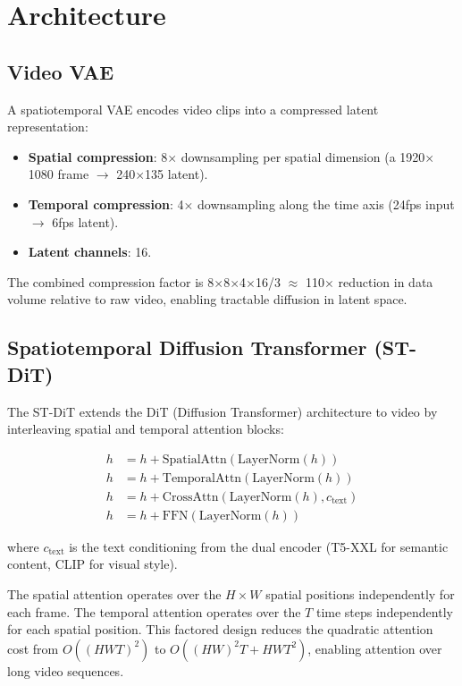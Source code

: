 \documentclass[11pt,a4paper]{article}
\begin{document}
\section{Architecture}

\subsection{Video VAE}

A spatiotemporal VAE encodes video clips into a compressed latent representation:
\begin{itemize}
    \item \textbf{Spatial compression}: 8$\times$ downsampling per spatial dimension
    (a 1920$\times$1080 frame $\to$ 240$\times$135 latent).
    \item \textbf{Temporal compression}: 4$\times$ downsampling along the time axis
    (24fps input $\to$ 6fps latent).
    \item \textbf{Latent channels}: 16.
\end{itemize}

The combined compression factor is 8$\times$8$\times$4$\times$16/3 $\approx$ 110$\times$
reduction in data volume relative to raw video, enabling tractable diffusion in latent space.

\subsection{Spatiotemporal Diffusion Transformer (ST-DiT)}

The ST-DiT extends the DiT (Diffusion Transformer) architecture to video by interleaving
spatial and temporal attention blocks:

\begin{align}
    h &= h + \text{SpatialAttn}(\text{LayerNorm}(h)) \\
    h &= h + \text{TemporalAttn}(\text{LayerNorm}(h)) \\
    h &= h + \text{CrossAttn}(\text{LayerNorm}(h), c_{\text{text}}) \\
    h &= h + \text{FFN}(\text{LayerNorm}(h))
\end{align}

where $c_{\text{text}}$ is the text conditioning from the dual encoder (T5-XXL for semantic
content, CLIP for visual style).

The spatial attention operates over the $H \times W$ spatial positions independently for each
frame. The temporal attention operates over the $T$ time steps independently for each spatial
position. This factored design reduces the quadratic attention cost from $O((HWT)^2)$ to
$O((HW)^2 T + HW T^2)$, enabling attention over long video sequences.
\end{document}
